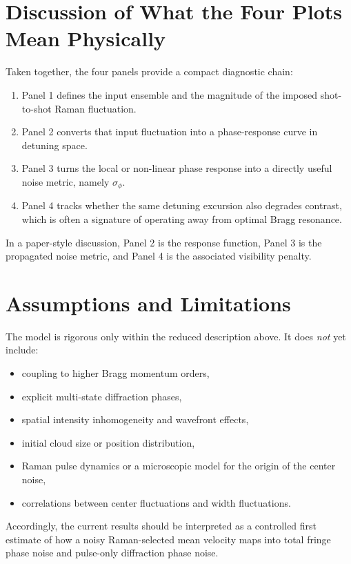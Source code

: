 \documentclass[11pt]{article}
\begin{document}
\section{Discussion of What the Four Plots Mean Physically}
Taken together, the four panels provide a compact diagnostic chain:
\begin{enumerate}[leftmargin=1.5em]
  \item Panel 1 defines the input ensemble and the magnitude of the imposed shot-to-shot Raman fluctuation.
  \item Panel 2 converts that input fluctuation into a phase-response curve in detuning space.
  \item Panel 3 turns the local or non-linear phase response into a directly useful noise metric, namely $\sigma_\phi$.
  \item Panel 4 tracks whether the same detuning excursion also degrades contrast, which is often a signature of operating away from optimal Bragg resonance.
\end{enumerate}
In a paper-style discussion, Panel 2 is the response function, Panel 3 is the propagated noise metric, and Panel 4 is the associated visibility penalty.

\section{Assumptions and Limitations}
The model is rigorous only within the reduced description above. It does \emph{not} yet include:
\begin{itemize}[leftmargin=1.5em]
  \item coupling to higher Bragg momentum orders,
  \item explicit multi-state diffraction phases,
  \item spatial intensity inhomogeneity and wavefront effects,
  \item initial cloud size or position distribution,
  \item Raman pulse dynamics or a microscopic model for the origin of the center noise,
  \item correlations between center fluctuations and width fluctuations.
\end{itemize}
Accordingly, the current results should be interpreted as a controlled first estimate of how a noisy Raman-selected mean velocity maps into total fringe phase noise and pulse-only diffraction phase noise.
\end{document}
